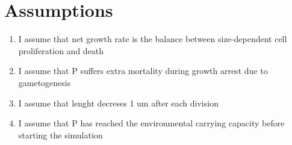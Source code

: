 \documentclass[a4paper,oneside]{book}
\begin{document}
    \begin{table}[h]
      \centering
      {%
      \begin{subtable}{.5\textwidth}\centering\scriptsize
        {}
        \caption{$d, r_p:r_{f1}$}
      \end{subtable}

      \vspace{0.5cm}
      \begin{subtable}{.5\textwidth}\centering\scriptsize
        {}
        \caption{$\alpha, r_p:r_{f1}$}
      \end{subtable}
       \caption{Tabular data for different parameter 2D subspaces and growth arrest duration of 5 days}\label{tbl2}
     }
    \end{table}
%
  \section*{Assumptions} 
    \begin{enumerate}
      \item I assume that net growth rate is the balance between size-dependent cell proliferation and death
      \item I assume that P suffers extra mortality during growth arrest due to gametogenesis
      \item I assume that lenght decreses 1 um after each division
      \item I assume that P has reached the environmental carrying capacity before starting the simulation
    \end{enumerate}
\end{document}

